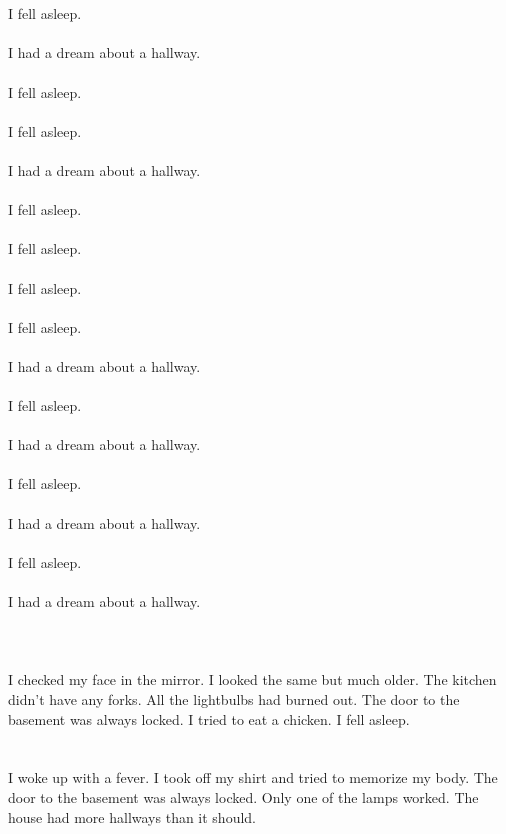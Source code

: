 \documentclass{article}
\begin{document}
    \section{}
    I fell asleep.\\\\I had a dream about a hallway.\\\\ I fell asleep.\\\\ I fell asleep.\\\\I had a dream about a hallway.\\\\ I fell asleep.\\\\ I fell asleep.\\\\ I fell asleep.\\\\ I fell asleep.\\\\I had a dream about a hallway.\\\\ I fell asleep.\\\\I had a dream about a hallway.\\\\ I fell asleep.\\\\I had a dream about a hallway.\\\\ I fell asleep.\\\\I had a dream about a hallway.\\\\ 
    \newpage
    
    \section{}
    I checked my face in the mirror. I looked the same but much older. The kitchen didn't have any forks. All the lightbulbs had burned out. The door to the basement was always locked. I tried to eat a chicken. I fell asleep.  
    \newpage
    
    \section{}
    I woke up with a fever. I took off my shirt and tried to memorize my body. The door to the basement was always locked. Only one of the lamps worked. The house had more hallways than it should.  
    \newpage
    
\end{document}
